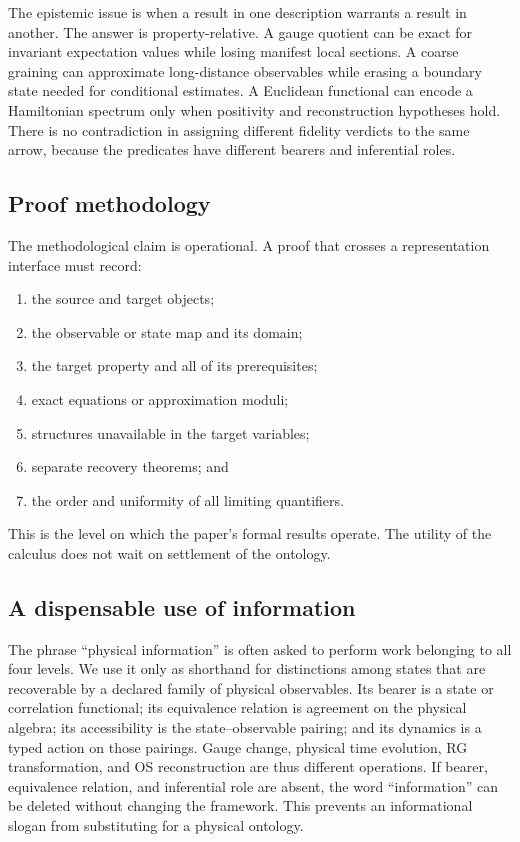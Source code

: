 The epistemic issue is when a result in one description warrants a result in
another.  The answer is property-relative.  A gauge quotient can be exact for
invariant expectation values while losing manifest local sections.  A coarse
graining can approximate long-distance observables while erasing a boundary
state needed for conditional estimates.  A Euclidean functional can encode a
Hamiltonian spectrum only when positivity and reconstruction hypotheses hold.
There is no contradiction in assigning different fidelity verdicts to the
same arrow, because the predicates have different bearers and inferential
roles.

\subsection{Proof methodology}

The methodological claim is operational.  A proof that crosses a
representation interface must record:
\begin{enumerate}[label=(\roman*),itemsep=2pt]
  \item the source and target objects;
  \item the observable or state map and its domain;
  \item the target property and all of its prerequisites;
  \item exact equations or approximation moduli;
  \item structures unavailable in the target variables;
  \item separate recovery theorems; and
  \item the order and uniformity of all limiting quantifiers.
\end{enumerate}
This is the level on which the paper's formal results operate.  The utility of
the calculus does not wait on settlement of the ontology.

\subsection{A dispensable use of information}

The phrase ``physical information'' is often asked to perform work belonging
to all four levels.  We use it only as shorthand for distinctions among
states that are recoverable by a declared family of physical observables.  Its
bearer is a state or correlation functional; its equivalence relation is
agreement on the physical algebra; its accessibility is the state--observable
pairing; and its dynamics is a typed action on those pairings.  Gauge change,
physical time evolution, RG transformation, and OS reconstruction are thus
different operations.  If bearer, equivalence relation, and inferential role
are absent, the word ``information'' can be deleted without changing the
framework.  This prevents an informational slogan from substituting for a
physical ontology.
